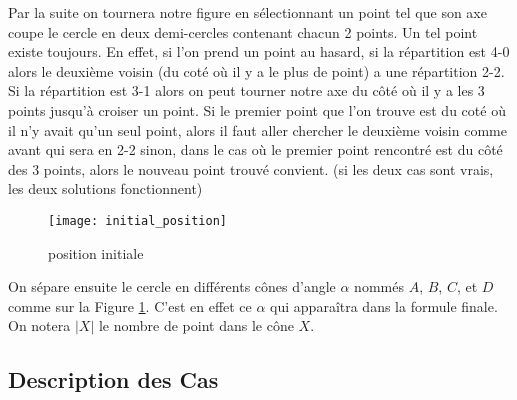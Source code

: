Par la suite on tournera notre figure en sélectionnant un point tel que son axe coupe le cercle en deux demi-cercles contenant chacun 2 points. Un tel point existe toujours. En effet, si l'on prend un point au hasard, si la répartition est 4-0  alors le deuxième voisin (du coté où il y a le plus de point) a une répartition 2-2. Si la répartition est 3-1 alors on peut tourner notre axe du côté où il y a les 3 points jusqu'à croiser un point. Si le premier point que l'on trouve est du coté où il n'y avait qu'un seul point, alors il faut aller chercher le deuxième voisin comme avant qui sera en 2-2 sinon, dans le cas où le premier point rencontré est du côté des 3 points, alors le nouveau point trouvé convient. (si les deux cas sont vrais, les deux solutions fonctionnent)

\begin{figure}[h!]
 \centering
  \texttt{[image: initial\_position]}
 \caption{position initiale}
 \label{fig:initial_position}
\end{figure}

  On sépare ensuite le cercle en différents cônes d'angle $\alpha$ nommés $A$,
  $B$, $C$, et $D$ comme sur la Figure \ref{fig:initial_position}. C'est en
  effet ce $\alpha$ qui apparaîtra dans la formule finale. On notera $|X|$ le
  nombre de point dans le cône $X$.

\subsection*{Description des Cas}


